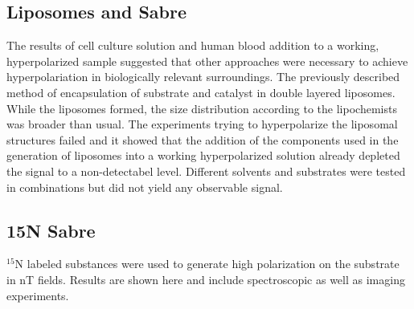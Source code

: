     \subsection{Liposomes and Sabre}
        The results of cell culture solution and human blood addition to a working, hyperpolarized sample suggested that other approaches were necessary to achieve hyperpolariation in biologically relevant surroundings. The previously described method of encapsulation of substrate and catalyst in double layered liposomes. While the liposomes formed, the size distribution according to the lipochemists was broader than usual.  The experiments trying to hyperpolarize the liposomal structures failed and it showed that the addition of the components used in the generation of liposomes into a working hyperpolarized solution already depleted the signal to a non-detectabel level. Different solvents and substrates were tested in combinations but did not yield any observable signal.
    \subsection{15N Sabre}
        $^{15}\mathrm{N}$ labeled substances were used to generate high polarization on the substrate in \si{\nano\tesla} fields. Results are shown here and include spectroscopic as well as imaging experiments.
